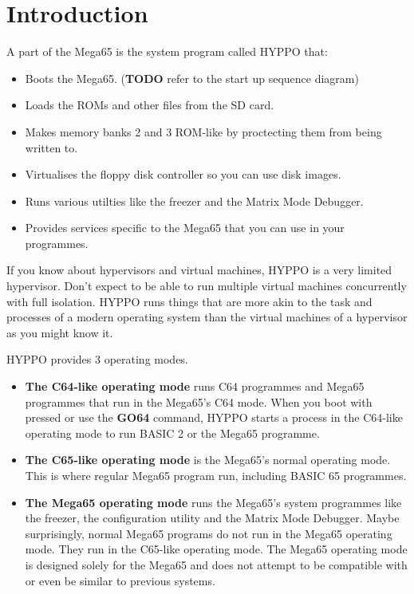 \section{Introduction}
A part of the Mega65 is the system program called HYPPO that:
\begin{itemize}
  \item Boots the Mega65. ({\textbf{\color{red}TODO}} refer to the start up sequence diagram)
  \item Loads the ROMs and other files from the SD card.
  \item Makes memory banks 2 and 3 ROM-like by proctecting them from being
        written to.
  \item Virtualises the floppy disk controller so you can use disk images.
  \item Runs various utilties like the freezer and the Matrix Mode Debugger.
  \item Provides services specific to the Mega65 that you can use in your
        programmes.
\end{itemize}

If you know about hypervisors and virtual machines, HYPPO is a very limited
hypervisor. Don't expect to be able to run multiple virtual machines
concurrently with full isolation. HYPPO runs things that are more akin to the
task and processes of a modern operating system than the virtual machines of a
hypervisor as you might know it.

HYPPO provides 3 operating modes.

\begin{itemize}
  \item \textbf{The C64-like operating mode} runs C64 programmes and Mega65
        programmes that run in the Mega65's C64 mode. When you boot with
        \megasymbolkey pressed or use the \textbf{GO64} command, HYPPO
        starts a process in the C64-like operating mode to run BASIC 2 or the
        Mega65 programme.
  \item \textbf{The C65-like operating mode} is the Mega65's normal operating
        mode. This is where regular Mega65 program run, including BASIC 65
        programmes.
  \item \textbf{The Mega65 operating mode} runs the Mega65's system programmes
        like the freezer, the configuration utility and the Matrix Mode
        Debugger. Maybe surprisingly, normal Mega65 programs do not run in the
        Mega65 operating mode. They run in the C65-like operating mode. The
        Mega65 operating mode is designed solely for the Mega65 and does not
        attempt to be compatible with or even be similar to previous systems.
\end{itemize}

